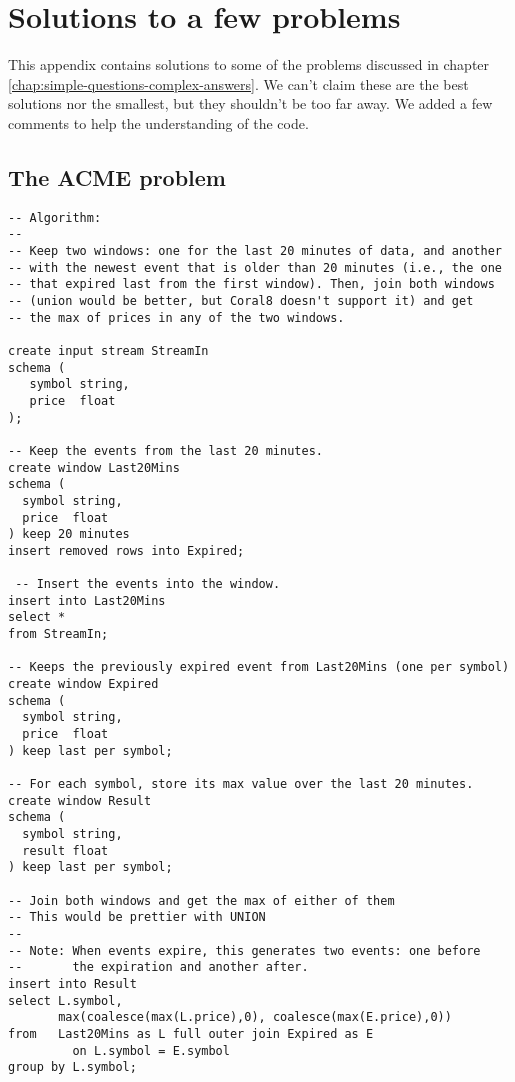\chapter{Solutions to a few problems}

This appendix contains solutions to some of the problems discussed in
chapter \ref{chap:simple-questions-complex-answers}. We can't claim
these are the best solutions nor the smallest, but they shouldn't be
too far away. We added a few comments to help the understanding of the
code.

\section{The ACME problem}
\label{sec:acme-problem-solution}

\lstset{
  language=CCL,
  columns=fullflexible,
  basicstyle=\tt,
  keywordstyle=[1]\bf,
  keywordstyle=[2]\it,
}


\begin{lstlisting}
-- Algorithm:
--
-- Keep two windows: one for the last 20 minutes of data, and another
-- with the newest event that is older than 20 minutes (i.e., the one
-- that expired last from the first window). Then, join both windows
-- (union would be better, but Coral8 doesn't support it) and get
-- the max of prices in any of the two windows.

create input stream StreamIn
schema (
   symbol string,
   price  float
);

-- Keep the events from the last 20 minutes.
create window Last20Mins
schema (
  symbol string,
  price  float
) keep 20 minutes
insert removed rows into Expired;

 -- Insert the events into the window.
insert into Last20Mins
select *
from StreamIn;

-- Keeps the previously expired event from Last20Mins (one per symbol)
create window Expired
schema (
  symbol string,
  price  float
) keep last per symbol;

-- For each symbol, store its max value over the last 20 minutes.
create window Result
schema (
  symbol string,
  result float
) keep last per symbol;

-- Join both windows and get the max of either of them
-- This would be prettier with UNION
--
-- Note: When events expire, this generates two events: one before
--       the expiration and another after.
insert into Result
select L.symbol,
       max(coalesce(max(L.price),0), coalesce(max(E.price),0))
from   Last20Mins as L full outer join Expired as E
         on L.symbol = E.symbol
group by L.symbol;
\end{lstlisting}

